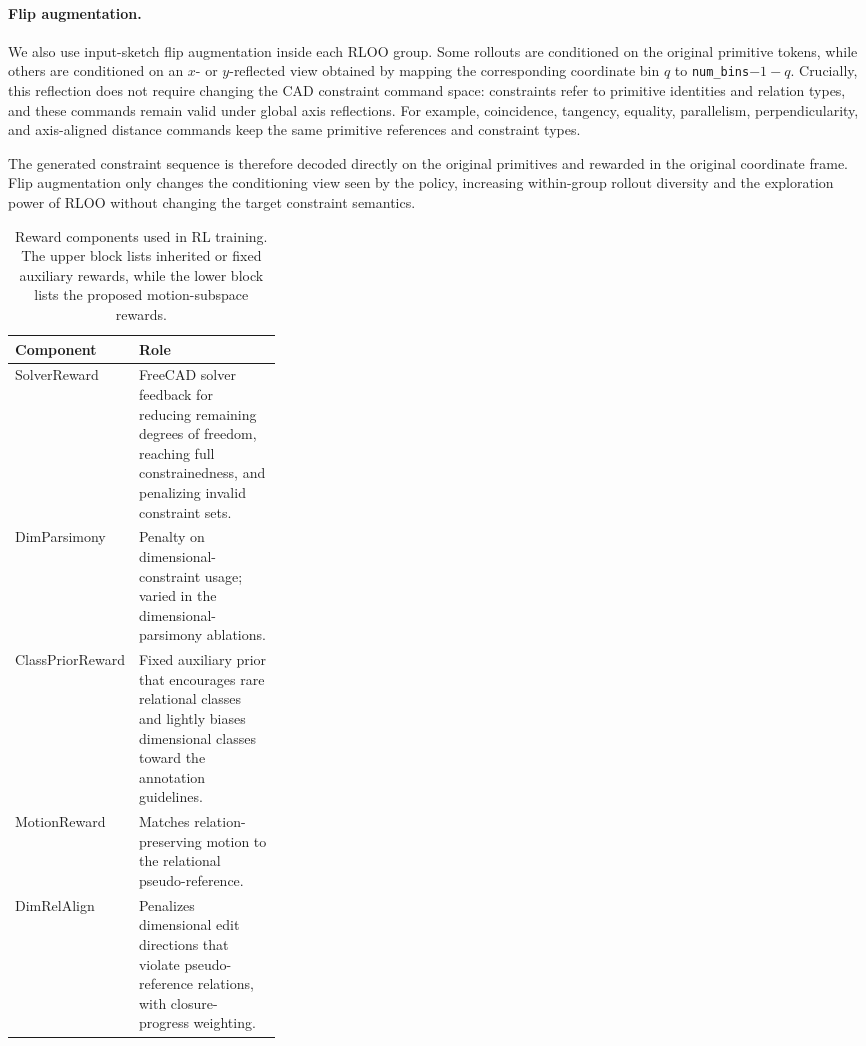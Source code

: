 \paragraph{Flip augmentation.}
\label{sec:appendix_rl_flip_aug}
We also use input-sketch flip augmentation inside each RLOO group. Some rollouts are conditioned on the original primitive tokens, while others are conditioned on an $x$- or $y$-reflected view obtained by mapping the corresponding coordinate bin $q$ to \texttt{num\_bins}$-1-q$. Crucially, this reflection does not require changing the CAD constraint command space: constraints refer to primitive identities and relation types, and these commands remain valid under global axis reflections. For example, coincidence, tangency, equality, parallelism, perpendicularity, and axis-aligned distance commands keep the same primitive references and constraint types.

The generated constraint sequence is therefore decoded directly on the original primitives and rewarded in the original coordinate frame. Flip augmentation only changes the conditioning view seen by the policy, increasing within-group rollout diversity and the exploration power of RLOO without changing the target constraint semantics.

\begin{table}[t]
    \centering
    \footnotesize
    \setlength{\tabcolsep}{3pt}
    \caption{Reward components used in RL training. The upper block lists inherited or fixed auxiliary rewards, while the lower block lists the proposed motion-subspace rewards.}
    \label{tab:appendix_rl_components}
    \begin{tabularx}{\linewidth}{@{}p{0.31\linewidth}X@{}}
    \toprule
    Component & Role \\
    \midrule
    SolverReward & FreeCAD solver feedback for reducing remaining degrees of freedom, reaching full constrainedness, and penalizing invalid constraint sets. \\
    DimParsimony & Penalty on dimensional-constraint usage; varied in the dimensional-parsimony ablations. \\
    ClassPriorReward & Fixed auxiliary prior that encourages rare relational classes and lightly biases dimensional classes toward the annotation guidelines. \\
    \midrule
    MotionReward & Matches relation-preserving motion to the relational pseudo-reference. \\
    DimRelAlign & Penalizes dimensional edit directions that violate pseudo-reference relations, with closure-progress weighting. \\
    \bottomrule
    \end{tabularx}
\end{table}


